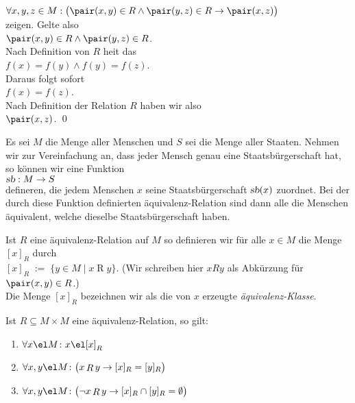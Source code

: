 \begin{enumerate}
      $\forall x,y,z \in M: \bigl(\pair(x,y) \in R \wedge \pair(y,z) \in R \rightarrow \pair(x,z)\bigr)$
      \\[0.2cm]
      zeigen.  Gelte also 
      \\[0.2cm]
      \hspace*{1.3cm}
      $\pair(x,y) \in R \wedge \pair(y,z) \in R$.
      \\[0.2cm]
      Nach Definition von $R$ hei\3t das 
      \\[0.2cm]
      \hspace*{1.3cm}
      $f(x) = f(y) \wedge f(y) = f(z)$.
      \\[0.2cm]
      Daraus folgt sofort 
      \\[0.2cm]
      \hspace*{1.3cm}
      $f(x) = f(z)$.
      \\[0.2cm]
      Nach Definition der Relation $R$ haben wir also 
      \\[0.2cm]
      \hspace*{1.3cm}
      $\pair(x,z)$.  \qed
\end{enumerate}

\example
Es sei $M$ die Menge aller Menschen und $S$ sei die Menge aller Staaten.  Nehmen wir zur
Vereinfachung an, dass jeder Mensch genau eine Staatsb\"{u}rgerschaft hat, so k\"{o}nnen wir eine Funktion
\\[0.2cm]
\hspace*{1.3cm}
$\textsl{sb}: M \rightarrow S$
\\[0.2cm]
defineren, die jedem Menschen $x$ seine Staatsb\"{u}rgerschaft $\textsl{sb}(x)$ zuordnet.  Bei der durch
diese Funktion definierten \"{a}quivalenz-Relation sind dann alle die Menschen \"{a}quivalent, welche dieselbe
Staatsb\"{u}rgerschaft haben.  


\begin{Definition}
Ist $R$ eine \"{a}quivalenz-Relation auf $M$ so definieren wir f\"{u}r alle $x \in M$ 
die Menge $[x]_R$ durch \\[0.2cm]
\hspace*{1.3cm} $[x]_R \;:=\; \bigl\{ y \in M \mid x \mathop{R} y \bigr\}$. \qquad
(Wir schreiben hier $x R y$ als Abk\"{u}rzung f\"{u}r $\pair(x, y) \in R$.) 
\\[0.2cm]
Die Menge $[x]_R$ bezeichnen wir als die von $x$ erzeugte \emph{\"{a}quivalenz-Klasse}.  
\end{Definition}

\begin{Satz} 
Ist $R \subseteq M \times M$ eine \"{a}quivalenz-Relation, so gilt: 
\begin{enumerate}
\item $\forall x \el M \colon x \el [x]_R$
\item $\forall x, y \el M \colon \bigl(x \mathop{R} y \rightarrow [x]_R = [y]_R\bigr)$
\item $\forall x, y \el M \colon \bigl(\neg x \mathop{R} y \rightarrow [x]_R \cap [y]_R = \emptyset\bigr)$
\end{enumerate}
\end{Satz}

